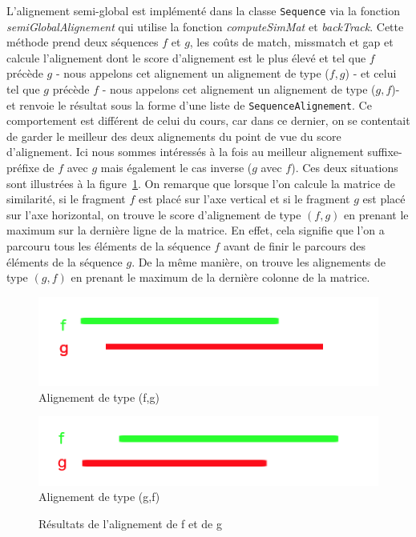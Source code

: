 L'alignement semi-global est implémenté dans la classe \verb|Sequence| via la fonction \emph{semiGlobalAlignement} qui utilise la fonction \emph{computeSimMat} et \emph{backTrack}. Cette méthode prend deux séquences $f$ et $g$, les coûts de match, missmatch et gap et calcule l'alignement dont le score d'alignement est le plus élevé et  tel que $f$ précède $g$ - nous appelons cet alignement un alignement de type ($f,g$) - et celui tel que $g$ précède $f$ - nous appelons cet alignement un alignement de type ($g,f$)- et renvoie le résultat sous la forme d'une liste de \verb|SequenceAlignement|. Ce comportement est différent de celui du cours, car dans ce dernier, on se contentait de garder le meilleur des deux alignements du point de vue du score d'alignement. Ici nous sommes intéressés à la fois  au meilleur alignement suffixe-préfixe de $f$ avec $g$ mais également le cas inverse ($g$ avec $f$). Ces deux situations sont illustrées à la figure~\ref{fig:alignementType}.
On remarque que lorsque l'on calcule la matrice de similarité, si le fragment $f$ est placé sur l'axe vertical et si le fragment $g$ est placé sur l'axe horizontal, on trouve le score d'alignement de type $(f,g)$ en prenant le maximum sur la dernière ligne de la matrice. En effet, cela signifie que l'on a parcouru tous les éléments de la séquence $f$ avant de finir le parcours des éléments de la séquence $g$. De la même manière, on trouve les alignements de type $(g,f)$ en prenant le maximum de la dernière colonne de la matrice.\\

\begin{figure}
	\begin{minipage}[r]{.46\linewidth}
		\begin{center}
		\includegraphics[scale= 0.50]{(f,g).png}
		Alignement de type (f,g)
	\end{center}
	   \end{minipage} \hfill
	   \begin{minipage}[c]{.46\linewidth}
		\begin{center}
			\includegraphics[scale= 0.50]{(g,f).png}
			Alignement de type (g,f)
		\end{center}
			  \end{minipage}
		\caption{Résultats de l'alignement de f et de g}
		\label{fig:alignementType}
\end{figure}


